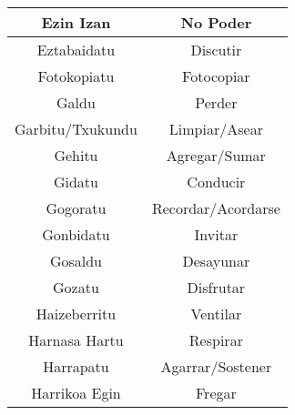 \documentclass[11pt, a4paper]{article}
\begin{document}
\begin{table}[h]
\begin{tabular}{cc}
		                       Ezin Izan                         &                            No Poder                            \\ \hline
		                      Eztabaidatu                        &                            Discutir                            \\ \hline
		                      Fotokopiatu                        &                           Fotocopiar                           \\ \hline
		                         Galdu                           &                             Perder                             \\ \hline
		                    Garbitu/Txukundu                     &                         Limpiar/Asear                          \\ \hline
		                         Gehitu                          &                         Agregar/Sumar                          \\ \hline
		                         Gidatu                          &                            Conducir                            \\ \hline
		                        Gogoratu                         &                       Recordar/Acordarse                       \\ \hline
		                       Gonbidatu                         &                            Invitar                             \\ \hline
		                        Gosaldu                          &                           Desayunar                            \\ \hline
		                         Gozatu                          &                           Disfrutar                            \\ \hline
		                      Haizeberritu                       &                            Ventilar                            \\ \hline
		                     Harnasa Hartu                       &                            Respirar                            \\ \hline
		                       Harrapatu                         &                        Agarrar/Sostener                        \\ \hline
		                     Harrikoa Egin                       &                             Fregar                             \\ \hline

\end{tabular}
\end{table}
\end{document}
